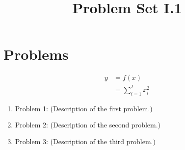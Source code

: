 \documentclass{article}
\title{Problem Set I.1}
\date{}
\begin{document}
\maketitle

\section*{Problems}

\begin{align}\label{intro}
    y & = f(x)               \\
      & = \sum_{i=1}^I x_i^2
\end{align}

\begin{enumerate}
    \item Problem 1: (Description of the first problem.)
    \item Problem 2: (Description of the second problem.)
    \item Problem 3: (Description of the third problem.)
\end{enumerate}
\end{document}
